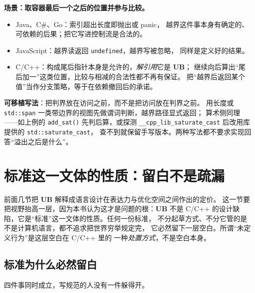 \documentclass[12pt,a4paper,fontset=fandol]{ctexbook}
\newcommand{\Fn}[1]{\texttt{#1()}}
\newcommand{\Tp}[1]{\texttt{#1}}
\newcommand{\Lang}[1]{\textsf{#1}}
\newcommand{\CL}{\Lang{C}}
\newcommand{\CPP}{\Lang{C++}}
\newcommand{\UB}{\textbf{\textsf{UB}}}
\newcommand{\Feat}[1]{\texttt{#1}}
\begin{document}
\begin{casebox}[title={在别的语言里良定义、在 C++ 里未定义的等价写法}]
\textbf{场景：取容器最后一个之后的位置并参与比较。}

\begin{itemize}
  \item \Lang{Java}、\Lang{C\#}、\Lang{Go}：索引超出长度即抛出或 panic，
        越界这件事本身有确定的、可依赖的后果；把它写进控制流是合法的。
  \item \Lang{JavaScript}：越界读返回 \Tp{undefined}，越界写被忽略，
        同样是定义好的结果。
  \item \CL/\CPP：构成尾后指针本身是允许的，\emph{解引用}它是 \UB{}；
        继续向后算出“尾后加一”这类位置，比较与相减的合法性都不再有保证。
        把“越界后返回某个值”当作分支策略，等于在依赖撤回后的承诺。
\end{itemize}

\textbf{可移植写法}：把判界放在访问之前，而不是把访问放在判界之前。
用长度或 \Tp{std::span} 一类带边界的视图先做谓词判断，越界路径显式返回；
算术侧同理——如上例的 \Fn{add\_sat} 先判后算，或探测
\Feat{\_\_cpp\_lib\_saturate\_cast} 后改用库提供的 \Tp{std::saturate\_cast}，
查不到就保留手写版本。两种写法都不要求实现回答“溢出之后是什么”。
\end{casebox}

\section{标准这一文体的性质：留白不是疏漏}\label{sec:ub02-standard-blanks}

前面几节把 \UB{} 解释成语言设计在表达力与优化空间之间作出的定价。
这一节要把视野抬高一层，因为本书认为这才是问题的根：\UB{} 不是
\CL{}/\CPP{} 的设计缺陷，它是“标准”这一文体的性质。任何一份标准，
不分起草方式、不分它管的是不是计算机语言，都不追求把世界穷举规定完，
它必然留下一层空白。所谓“未定义行为”是这层空白在 \CL{}/\CPP{} 里的
一种\emph{处置方式}，不是空白本身。

\subsection{标准为什么必然留白}\label{sec:ub02-blank-why}

四件事同时成立，写规范的人没有一件躲得开。
\end{document}
